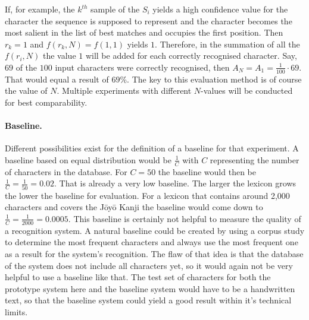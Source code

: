 If, for example, the \(k^{th}\) sample of the \(S_{i}\) yields a high 
confidence value for the character the sequence is supposed to represent and 
the character becomes the most salient in the list of best matches
and occupies the first position. Then \(r_{k} = 1\) and \(f(r_{k},N) = f(1,1)\) 
yields \(1\).
Therefore, in the summation of all the \(f(r_{i},N)\) the value \(1\) 
will be added for each correctly recognised character.
Say, \(69\) of the \(100\) input characters were correctly recognised,
then \(A_{N} = A_{1} = \frac{1}{100} \cdot 69\). That would equal a 
result of \(69\%\). The key to this evaluation method is of course the 
value of \(N\). Multiple experiments with different \(N\)-values will be 
conducted for best comparability.

\paragraph{Baseline.} Different possibilities exist for the definition of a 
baseline for that experiment. A baseline based on equal distribution would 
be \(\frac{1}{C}\) with \(C\) representing the number of characters 
in the database. 
For \(C = 50\) the baseline would then be \(\frac{1}{C} = \frac{1}{50} = 0.02\).
That is already a very low baseline. The larger the lexicon grows the
lower the baseline for evaluation. For a lexicon that contains around 2,000 
characters and covers the Jōyō Kanji the baseline would come down to
\(\frac{1}{C} = \frac{1}{2000} = 0.0005\).
This baseline is certainly not helpful to measure the quality of a 
recognition system. A natural baseline could be created by using 
a corpus study to determine the most frequent characters and always use
the most frequent one as a result for the system's recognition.
The flaw of that idea is that the database of the system does not
include all characters yet, so it would again not be very helpful to use
a baseline like that. The test set of characters for both the prototype
system here and the baseline system would have to be 
a handwritten text, so that the baseline system could yield a good result
within it's technical limits.

